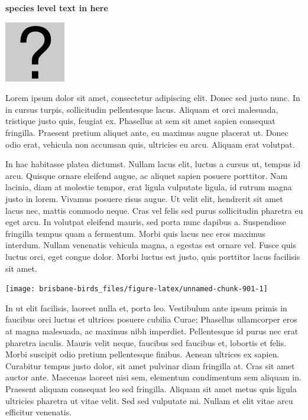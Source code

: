 \documentclass[]{book}
\let\origfigure\figure
\let\endorigfigure\endfigure
\renewenvironment{figure}[1][2] {
  \expandafter\origfigure\expandafter[H]
} {
  \endorigfigure
}
\begin{document}
\textbf{species level text in here}

\begin{figure}
\centering
\includegraphics{assets/missing.png}
\caption{No image for species}
\end{figure}

Lorem ipsum dolor sit amet, consectetur adipiscing elit. Donec sed justo
nunc. In in cursus turpis, sollicitudin pellentesque lacus. Aliquam et
orci malesuada, tristique justo quis, feugiat ex. Phasellus at sem sit
amet sapien consequat fringilla. Praesent pretium aliquet ante, eu
maximus augue placerat ut. Donec odio erat, vehicula non accumsan quis,
ultricies eu arcu. Aliquam erat volutpat.

In hac habitasse platea dictumst. Nullam lacus elit, luctus a cursus ut,
tempus id arcu. Quisque ornare eleifend augue, ac aliquet sapien posuere
porttitor. Nam lacinia, diam at molestie tempor, erat ligula vulputate
ligula, id rutrum magna justo in lorem. Vivamus posuere risus augue. Ut
velit elit, hendrerit sit amet lacus nec, mattis commodo neque. Cras vel
felis sed purus sollicitudin pharetra eu eget arcu. In volutpat eleifend
mauris, sed porta nunc dapibus a. Suspendisse fringilla tempus quam a
fermentum. Morbi quis lacus nec eros maximus interdum. Nullam venenatis
vehicula magna, a egestas est ornare vel. Fusce quis luctus orci, eget
congue dolor. Morbi luctus est justo, quis porttitor lacus facilisis sit
amet.

\begin{figure}
\texttt{[image: brisbane-birds\_files/figure-latex/unnamed-chunk-901-1]} \caption{insert figure caption}\label{fig:unnamed-chunk-901}
\end{figure}

In ut elit facilisis, laoreet nulla et, porta leo. Vestibulum ante ipsum
primis in faucibus orci luctus et ultrices posuere cubilia Curae;
Phasellus ullamcorper eros at magna malesuada, ac maximus nibh
imperdiet. Pellentesque id purus nec erat pharetra iaculis. Mauris velit
neque, faucibus sed faucibus et, lobortis et felis. Morbi suscipit odio
pretium pellentesque finibus. Aenean ultrices ex sapien. Curabitur
tempus justo dolor, sit amet pulvinar diam fringilla at. Cras sit amet
auctor ante. Maecenas laoreet nisi sem, elementum condimentum sem
aliquam in. Praesent aliquam consequat leo sed fringilla. Aliquam sit
amet metus quis ligula ultricies pharetra ut vitae velit. Sed sed
vulputate mi. Nullam et elit vitae arcu efficitur venenatis.
\end{document}
